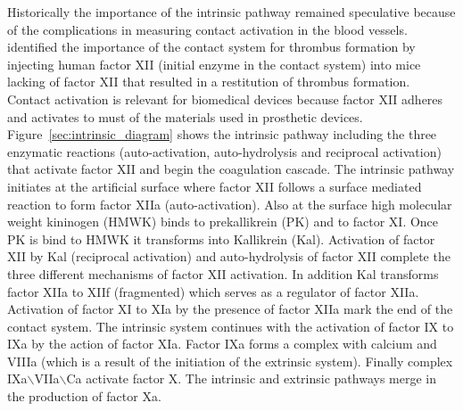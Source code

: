 \documentclass[%
 nofootinbib,
 amsmath,amssymb,
 aps,
 pra,
]{revtex4-1}
\begin{document}
Historically the importance of the intrinsic pathway remained speculative because of the complications in measuring contact activation in the blood vessels. \citet{Renne:2005} identified the importance of the contact system for thrombus formation by injecting human factor XII (initial enzyme in the contact system) into mice lacking of factor XII that resulted in a restitution of thrombus formation. Contact activation is relevant for biomedical devices because factor XII adheres and activates to must of the materials used in prosthetic devices.\\
Figure~\ref{sec:intrinsic_diagram} shows the intrinsic pathway including the three enzymatic reactions (auto-activation, auto-hydrolysis and reciprocal activation) that activate factor XII and begin the coagulation cascade. The intrinsic pathway initiates at the artificial surface where factor XII follows a surface mediated reaction to form factor XIIa (auto-activation). Also at the surface %
high molecular weight kininogen (HMWK) binds to prekallikrein %
 (PK) and to factor XI. Once PK is bind to HMWK it transforms into %
Kallikrein (Kal). Activation of factor XII by Kal (reciprocal activation) and auto-hydrolysis of factor XII complete the three different mechanisms of factor XII activation. In addition Kal transforms factor XIIa to XIIf (fragmented) which serves as a regulator of factor XIIa. Activation of factor XI to XIa by the presence of factor XIIa mark the end of the contact system. The intrinsic system continues with the activation of factor IX to IXa by the action of factor XIa. Factor IXa forms a complex with calcium and VIIIa (which is a result of the initiation of the extrinsic system). Finally complex IXa$\backslash$VIIa$\backslash$Ca activate factor X. The intrinsic and extrinsic pathways merge in the production of factor Xa. \\
\end{document}
